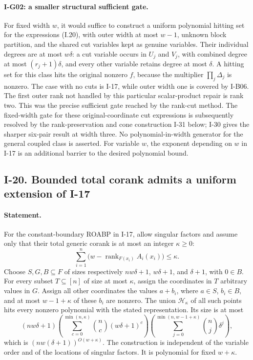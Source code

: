 \documentclass[11pt,a4paper]{article}
\theoremstyle{definition}\newtheorem{definition}{Definition}
\begin{document}
\paragraph{I-G02: a smaller structural sufficient gate.}
\label{I-G02}
For fixed width $w$, it would suffice to construct a uniform polynomial
hitting set for the expressions (I.20), with outer width at most
$w-1$, unknown block partition, and the shared cut variables kept
as genuine variables.  Their individual degrees are at most
$w\delta$: a cut variable occurs in $U_j$ and $V_j$, with combined
degree at most $(r_j+1)\delta$, and every other variable retains
degree at most $\delta$.  A hitting set for this class hits the
original nonzero $f$, because the multiplier $\prod_j\Delta_j$
is nonzero.  The case with no cuts is I-17, while outer width one
is covered by I-B06.  The first outer rank not handled by this
particular scalar-product repair is rank two.  This was the precise
sufficient gate reached by the rank-cut method.  The fixed-width gate for these original-coordinate cut expressions is
subsequently resolved by the rank-preservation and cone construction
I-31 below; I-30 gives the sharper six-pair result at width three.
No polynomial-in-width generator for the general coupled class is asserted.  For variable
$w$, the exponent depending on $w$ in I-17 is an additional barrier
to the desired polynomial bound.

\subsection{I-20. Bounded total corank admits a uniform extension of I-17}
\label{I-20}

\paragraph{Statement.}
For the constant-boundary ROABP in I-17, allow singular factors and
assume only that their total generic corank is at most an integer
$\kappa\ge0$:
\[
 \sum_{i=1}^n\bigl(w-\operatorname{rank}_{F(x_i)}A_i(x_i)\bigr)
 \le\kappa.
\]
Choose $S,G,B\subseteq F$ of sizes respectively
$nw\delta+1$, $w\delta+1$, and $\delta+1$, with $0\in B$.
For every subset $T\subseteq[n]$ of size at most $\kappa$, assign
the coordinates in $T$ arbitrary values in $G$.  Assign all other
coordinates the values $a+b_i$, where $a\in S$, $b_i\in B$, and
at most $w-1+\kappa$ of these $b_i$ are nonzero.  The union
$\mathcal H_\kappa$ of all such points hits every nonzero polynomial
with the stated representation.  Its size is at most
\[
 (nw\delta+1)
 \left(\sum_{c=0}^{\min(n,\kappa)}\binom nc(w\delta+1)^c\right)
 \left(\sum_{j=0}^{\min(n,w-1+\kappa)}\binom nj\delta^j\right),
\tag{I.21}\label{eq:I-corank-hit}
\]
which is $(nw(\delta+1))^{O(w+\kappa)}$.
The construction is independent of the variable order and of the
locations of singular factors.  It is polynomial for fixed
$w+\kappa$.
\end{document}
